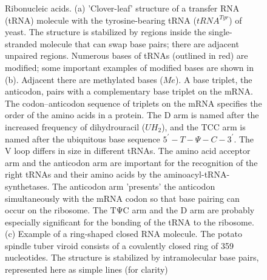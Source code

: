\documentclass[11pt,ignorenonframetext,aspectratio=169]{beamer}
\begin{document}
\begin{frame}{}
\begin{figure}
\begin{columns}[T,onlytextwidth]
  \caption{\newline Ribonucleic acids. (a) 'Clover-leaf' structure of a transfer RNA (tRNA) molecule with the tyrosine-bearing tRNA ($tRNA^{Tyr}$) of yeast. The structure is stabilized by regions inside the single-stranded molecule that can swap base pairs; there are adjacent unpaired regions. Numerous bases of tRNAs (outlined in red) are modified; some important examples of modified bases are shown in (b). Adjacent there are methylated bases ($Me$). A base triplet, the anticodon, pairs with a complementary base triplet on the mRNA. The codon–anticodon sequence of triplets on the mRNA specifies the order of the amino acids in a protein. The D arm is named after the increased frequency of dihydrouracil ($UH_2$), and the TCC arm is named after the ubiquitous base sequence $5^{\prime} - T - \Psi - C - 3^{\prime}$. The V loop differs in size in different tRNAs. The amino acid acceptor arm and the anticodon arm are important for the recognition of the right tRNAs and their amino acids by the aminoacyl-tRNA-synthetases. The anticodon arm 'presents' the anticodon simultaneously with the mRNA codon so that base pairing can occur on the ribosome. The $\mathrm{T\Psi C}$ arm and the D arm are probably especially significant for the bonding of the tRNA to the ribosome. (c) Example of a ring-shaped closed RNA molecule. The potato spindle tuber viroid consists of a covalently closed ring of 359 nucleotides. The structure is stabilized by intramolecular base pairs, represented here as simple lines (for clarity)}
  \label{fig:ribonucleic-acids}

  \end{columns}
\end{figure}

\end{frame}
\end{document}
